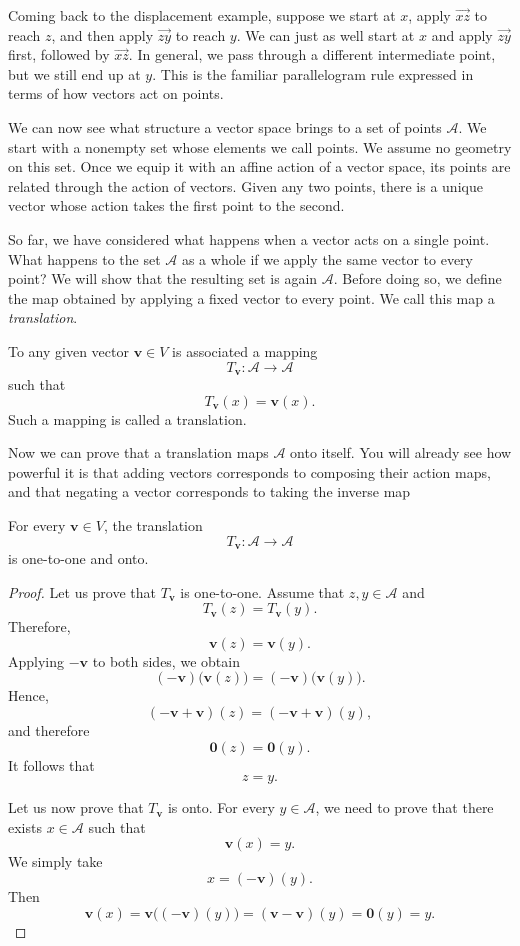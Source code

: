 \documentclass[12pt]{article}
\begin{document}
Coming back to the displacement example, suppose we start at $x$,
apply $\overrightarrow{xz}$ to reach $z$, and then apply
$\overrightarrow{zy}$ to reach $y$. We can just as well start at $x$
and apply $\overrightarrow{zy}$ first, followed by
$\overrightarrow{xz}$. In general, we pass through a different
intermediate point, but we still end up at $y$. This is the familiar
parallelogram rule expressed in terms of how vectors act on points.

We can now see what structure a vector space brings to a set of points
$\mathcal{A}$. We start with a nonempty set whose elements we call points.
We assume no geometry on this set. Once we equip it with an affine action
of a vector space, its points are related through the action of vectors.
Given any two points, there is a unique vector whose action takes the
first point to the second.

So far, we have considered what happens when a vector acts on a single
point. What happens to the set $\mathcal{A}$ as a whole if we apply the
same vector to every point? We will show that the resulting set is again
$\mathcal{A}$. Before doing so, we define the map obtained by applying
a fixed vector to every point. We call this map a \textit{translation}.

\begin{definition}[Translation]
To any given vector \(\mathbf{v}\in V\) is associated a mapping
\[
T_{\mathbf{v}}\colon \mathcal A\longrightarrow \mathcal A
\]
such that
\[
T_{\mathbf{v}}(x)=\mathbf{v}(x).
\]
Such a mapping is called a translation.
\end{definition}

Now we can prove that a translation maps $\mathcal A$ onto itself.
You will already see how powerful it is that adding vectors corresponds
to composing their action maps, and that negating a vector corresponds
to taking the inverse map

\begin{proposition}
For every \(\mathbf{v}\in V\), the translation
\[
T_{\mathbf{v}}\colon \mathcal A\longrightarrow \mathcal A
\]
is one-to-one and onto.
\end{proposition}

\begin{proof}
Let us prove that \(T_{\mathbf{v}}\) is one-to-one. Assume that
\(z,y\in \mathcal A\) and
\[
T_{\mathbf{v}}(z)=T_{\mathbf{v}}(y).
\]
Therefore,
\[
\mathbf{v}(z)=\mathbf{v}(y).
\]
Applying \(-\mathbf{v}\) to both sides, we obtain
\[
(-\mathbf{v})\bigl(\mathbf{v}(z)\bigr)
=
(-\mathbf{v})\bigl(\mathbf{v}(y)\bigr).
\]
Hence,
\[
(-\mathbf{v}+\mathbf{v})(z)
=
(-\mathbf{v}+\mathbf{v})(y),
\]
and therefore
\[
\mathbf{0}(z)=\mathbf{0}(y).
\]
It follows that
\[
z=y.
\]

Let us now prove that \(T_{\mathbf{v}}\) is onto. For every \(y\in \mathcal A\), we
need to prove that there exists \(x\in \mathcal A\) such that
\[
\mathbf{v}(x)=y.
\]
We simply take
\[
x=(-\mathbf{v})(y).
\]
Then
\[
\mathbf{v}(x)
=
\mathbf{v}\bigl((-\mathbf{v})(y)\bigr)
=
(\mathbf{v}-\mathbf{v})(y)
=
\mathbf{0}(y)
=
y.
\]
\end{proof}
\end{document}
